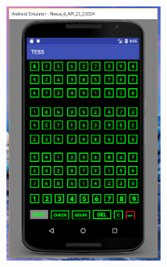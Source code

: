 \documentclass{article}
\begin{document}
\begin{figure}[H]
\begin{minipage}{.5\textwidth}
\end{minipage}%
\begin{minipage}{.5\textwidth}\centering \includegraphics[width=2.0in]{./Figure/Solve.PNG} \label{fig:gamePlay}
\end{minipage}%
\end{figure}
\end{document}
